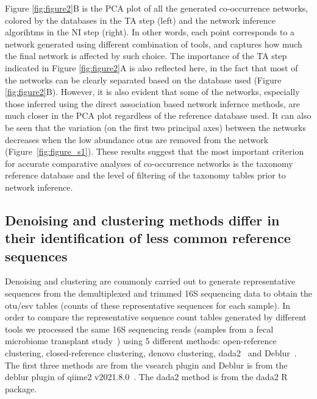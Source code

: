   Figure \ref{fig:figure2}B is the PCA plot of all the generated co-occurrence networks, colored by the databases in the TA step (left) and the network inference algorihtms in the NI step (right).
  In other words, each point corresponds to a network generated using different combination of tools, and captures how much the final network is affected by such choice.
  The importance of the TA step indicated in Figure \ref{fig:figure2}A is also reflected here, in the fact that most of the networks can be clearly separated based on the database used (Figure \ref{fig:figure2}B).
  However, it is also evident that some of the networks, especially those inferred using the direct association based network infernce methods, are much closer in the PCA plot regardless of the reference database used.
  It can also be seen that the variation (on the first two principal axes) between the networks decreases when the low abundance \ac{otu}s are removed from the network (Figure~\ref{fig:figure_s1}).
  These results suggest that the most important criterion for accurate comparative analyses of co-occurrence networks is the taxonomy reference database and the level of filtering of the taxonomy tables prior to network inference.

  \FloatBarrier

  \subsection*{Denoising and clustering methods differ in their identification of less common reference sequences}

  Denoising and clustering are commonly carried out to generate representative sequences from the demultiplexed and trimmed 16S sequencing data to obtain the \ac{otu}/\ac{esv} tables (counts of these representative sequences for each sample).
  In order to compare the representative sequence count tables generated by different tools we processed the same 16S sequencing reads (samples from a fecal microbiome transplant study~\cite{Kang2017}) using 5 different methods: open-reference clustering, closed-reference clustering, denovo clustering, \ac{dada2}~\cite{Callahan2016} and Deblur~\cite{Amir2017}.
  The first three methods are from the vsearch plugin and Deblur is from the deblur plugin of \ac{qiime2} v2021.8.0~\cite{bolyenReproducibleInteractiveScalable2019}.
  The \ac{dada2} method is from the \ac{dada2} R package.

